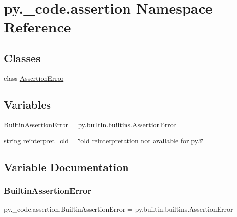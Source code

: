 \hypertarget{namespacepy_1_1__code_1_1assertion}{}\section{py.\+\_\+code.\+assertion Namespace Reference}
\label{namespacepy_1_1__code_1_1assertion}
\subsection*{Classes}
\begin{DoxyCompactItemize}
\item 
class \hyperlink{classpy_1_1__code_1_1assertion_1_1_assertion_error}{Assertion\+Error}
\end{DoxyCompactItemize}
\subsection*{Variables}
\begin{DoxyCompactItemize}
\item 
\hyperlink{namespacepy_1_1__code_1_1assertion_af4ca53c9f4257d66d8cb77fcf09a3bd6}{Builtin\+Assertion\+Error} = py.\+builtin.\+builtins.\+Assertion\+Error
\item 
string \hyperlink{namespacepy_1_1__code_1_1assertion_a4a45ce93fefb1b978178ae875b3a8372}{reinterpret\+\_\+old} = \char`\"{}old reinterpretation not available for py3\char`\"{}
\end{DoxyCompactItemize}


\subsection{Variable Documentation}
\mbox{\label{namespacepy_1_1__code_1_1assertion_af4ca53c9f4257d66d8cb77fcf09a3bd6}} 
\subsubsection{\texorpdfstring{Builtin\+Assertion\+Error}{BuiltinAssertionError}}
{\footnotesize\ttfamily py.\+\_\+code.\+assertion.\+Builtin\+Assertion\+Error = py.\+builtin.\+builtins.\+Assertion\+Error}

